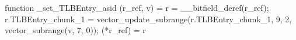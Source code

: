 function _set_TLBEntry_asid (r_ref, v) = {
    r = __bitfield_deref(r_ref);
    r.TLBEntry_chunk_1 = vector_update_subrange(r.TLBEntry_chunk_1, 9, 2, vector_subrange(v, 7, 0));
    (*r_ref) = r
}
